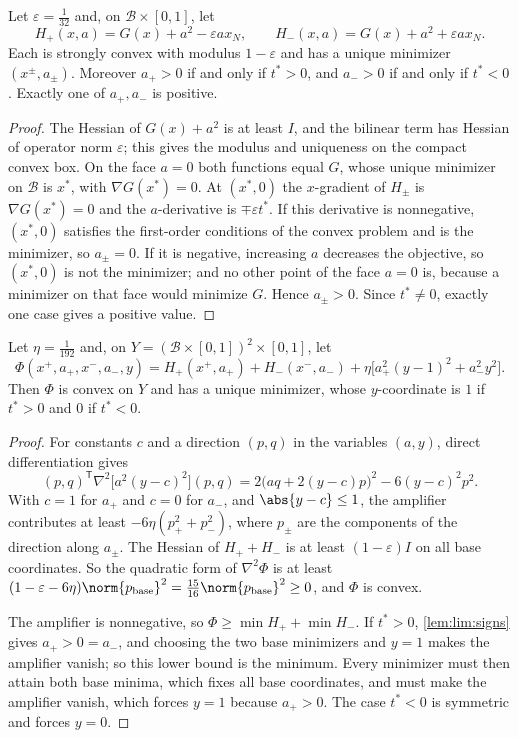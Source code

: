 \begin{lemma}\label{lem:lim:signs}
Let $\varepsilon=\frac1{32}$ and, on $\mathcal B\times[0,1]$, let
\[
 H_+(x,a)=G(x)+a^2-\varepsilon ax_N,\qquad H_-(x,a)=G(x)+a^2+\varepsilon ax_N .
\]
Each is strongly convex with modulus $1-\varepsilon$ and has a unique
minimizer $(x^\pm,a_\pm)$. Moreover $a_+>0$ if and only if $t^*>0$, and
$a_->0$ if and only if $t^*<0$. Exactly one of $a_+,a_-$ is positive.
\end{lemma}

\begin{proof}
The Hessian of $G(x)+a^2$ is at least $I$, and the bilinear term has Hessian
of operator norm $\varepsilon$; this gives the modulus and uniqueness on the
compact convex box. On the face $a=0$ both functions equal $G$, whose unique
minimizer on $\mathcal B$ is $x^*$, with $\nabla G(x^*)=0$. At $(x^*,0)$ the
$x$-gradient of $H_\pm$ is $\nabla G(x^*)=0$ and the $a$-derivative is
$\mp\varepsilon t^*$. If this derivative is nonnegative, $(x^*,0)$
satisfies the first-order conditions of the convex problem and is the
minimizer, so $a_\pm=0$. If it is negative, increasing $a$ decreases the
objective, so $(x^*,0)$ is not the minimizer; and no other point of the face
$a=0$ is, because a minimizer on that face would minimize $G$. Hence
$a_\pm>0$. Since $t^*\ne0$, exactly one case gives a positive value.
\end{proof}

\begin{lemma}\label{lem:lim:amplifier}
Let $\eta=\frac1{192}$ and, on $Y=(\mathcal B\times[0,1])^2\times[0,1]$, let
\[
 \Phi(x^+,a_+,x^-,a_-,y)=H_+(x^+,a_+)+H_-(x^-,a_-)
 +\eta\bigl[a_+^2(y-1)^2+a_-^2y^2\bigr].
\]
Then $\Phi$ is convex on $Y$ and has a unique minimizer, whose
$y$-coordinate is $1$ if $t^*>0$ and $0$ if $t^*<0$.
\end{lemma}

\begin{proof}
For constants $c$ and a direction $(p,q)$ in the variables $(a,y)$, direct
differentiation gives
\[
 (p,q)^{\mathsf T}\nabla^2\bigl[a^2(y-c)^2\bigr](p,q)
 =2\bigl(aq+2(y-c)p\bigr)^2-6(y-c)^2p^2 .
\]
With $c=1$ for $a_+$ and $c=0$ for $a_-$, and $\abs{y-c}\le1$, the
amplifier contributes at least $-6\eta(p_+^2+p_-^2)$, where $p_\pm$ are the
components of the direction along $a_\pm$. The Hessian of $H_++H_-$ is at
least $(1-\varepsilon)I$ on all base coordinates. So the quadratic form of
$\nabla^2\Phi$ is at least $(1-\varepsilon-6\eta)\norm{p_{\mathrm{base}}}^2
=\frac{15}{16}\norm{p_{\mathrm{base}}}^2\ge0$, and $\Phi$ is convex.

The amplifier is nonnegative, so $\Phi\ge\min H_++\min H_-$. If $t^*>0$,
\cref{lem:lim:signs} gives $a_+>0=a_-$, and choosing the two base
minimizers and $y=1$ makes the amplifier vanish; so this lower bound is the
minimum. Every minimizer must then attain both base minima, which fixes all
base coordinates, and must make the amplifier vanish, which forces $y=1$
because $a_+>0$. The case $t^*<0$ is symmetric and forces $y=0$.
\end{proof}

